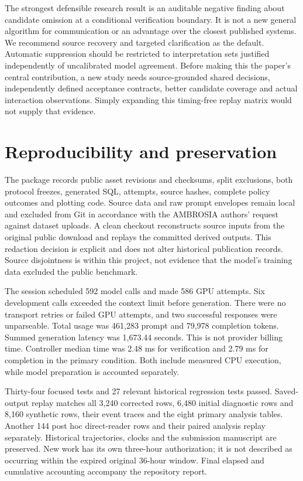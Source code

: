 \documentclass[11pt]{article}
\begin{document}
The strongest defensible research result is an auditable negative finding about candidate omission at a conditional verification boundary. It is not a new general algorithm for communication or an advantage over the closest published systems. We recommend source recovery and targeted clarification as the default. Automatic suppression should be restricted to interpretation sets justified independently of uncalibrated model agreement. Before making this the paper's central contribution, a new study needs source-grounded shared decisions, independently defined acceptance contracts, better candidate coverage and actual interaction observations. Simply expanding this timing-free replay matrix would not supply that evidence.

\section{Reproducibility and preservation}
The package records public asset revisions and checksums, split exclusions, both protocol freezes, generated SQL, attempts, source hashes, complete policy outcomes and plotting code. Source data and raw prompt envelopes remain local and excluded from Git in accordance with the AMBROSIA authors' request against dataset uploads. A clean checkout reconstructs source inputs from the original public download and replays the committed derived outputs. This redaction decision is explicit and does not alter historical publication records. Source disjointness is within this project, not evidence that the model's training data excluded the public benchmark.

The session scheduled 592 model calls and made 586 GPU attempts. Six development calls exceeded the context limit before generation. There were no transport retries or failed GPU attempts, and two successful responses were unparseable. Total usage was 461,283 prompt and 79,978 completion tokens. Summed generation latency was 1,673.44 seconds. This is not provider billing time. Controller median time was 2.48 ms for verification and 2.79 ms for completion in the primary condition. Both include measured CPU execution, while model preparation is accounted separately.

Thirty-four focused tests and 27 relevant historical regression tests passed. Saved-output replay matches all 3,240 corrected rows, 6,480 initial diagnostic rows and 8,160 synthetic rows, their event traces and the eight primary analysis tables. Another 144 post hoc direct-reader rows and their paired analysis replay separately. Historical trajectories, clocks and the submission manuscript are preserved. New work has its own three-hour authorization; it is not described as occurring within the expired original 36-hour window. Final elapsed and cumulative accounting accompany the repository report.
\end{document}
